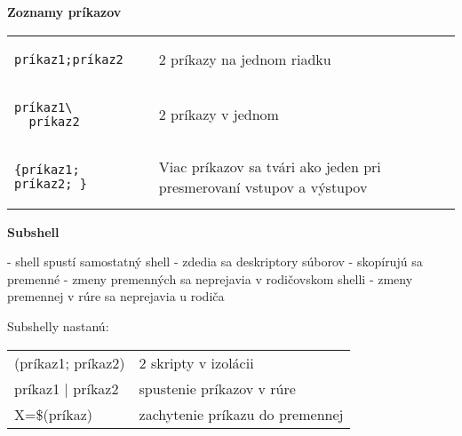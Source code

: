 \documentclass[8pt,landscape]{extarticle}
\newcommand{\Heading}[1]{%
{\begin{center}\bfseries\Large#1\end{center}}%
}%
\newenvironment{karticka}[1]%
{%
\Heading{#1}%
}%
{%
\clearpage
}%
\begin{document}
\begin{karticka}{Zoznamy príkazov}
\begin{table}[h!]
\begin{tabular}{p{3.3cm}|p{4.5cm}}
\begin{tcolorbox}[sharp corners,left=0mm,right=0mm,leftrule=0mm,rightrule=0mm,toprule=0mm,bottomrule=0mm,enlarge bottom by=-5mm]
\begin{Verbatim}
príkaz1;príkaz2
\end{Verbatim}
\end{tcolorbox}
&
2 príkazy na jednom riadku
\\
\begin{tcolorbox}[sharp corners,left=0mm,right=0mm,leftrule=0mm,rightrule=0mm,toprule=0mm,bottomrule=0mm,enlarge bottom by=-5mm]
\begin{Verbatim}
príkaz1\
  príkaz2
\end{Verbatim}
\end{tcolorbox}
& 2 príkazy v jednom
\\
\begin{tcolorbox}[sharp corners,left=0mm,right=0mm,leftrule=0mm,rightrule=0mm,toprule=0mm,bottomrule=0mm,enlarge bottom by=-5mm]
\begin{Verbatim}
{príkaz1; príkaz2; }
\end{Verbatim}
\end{tcolorbox}
&
Viac príkazov  
sa tvári ako  
jeden pri 
presmerovaní  
vstupov 
a výstupov
\end{tabular}
\end{table}


\end{karticka}
\begin{karticka}{Subshell}
\begin{obsah}
- shell spustí samostatný shell
- zdedia sa deskriptory súborov
- skopírujú sa premenné
  - zmeny premenných sa neprejavia v rodičovskom shelli
  - zmeny premennej v rúre sa neprejavia u rodiča
\end{obsah}

Subshelly nastanú:\par\vspace{1em}

\begin{tabular}{ll}
(príkaz1; príkaz2) & 2 skripty v izolácii
\\
príkaz1 | príkaz2 & spustenie príkazov v rúre\\
X=\$(príkaz) & zachytenie príkazu do premennej
\end{tabular}
\end{karticka}
\end{document}
